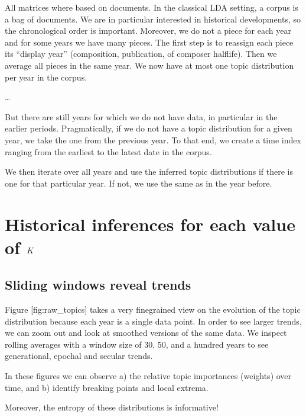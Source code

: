 \documentclass[letterpaper,10pt,english]{sphinxmanual}
\begin{document}
\sphinxAtStartPar
All matrices where based on documents. In the classical LDA setting, a
corpus is a bag of documents. We are in particular interested in
historical developments, so the chronological order is important.
Moreover, we do not a piece for each year and for some years we have
many pieces. The first step is to re\sphinxhyphen{}assign each piece its “display
year” (composition, publication, of composer half\sphinxhyphen{}life). Then we average
all pieces in the same year. We now have at most one topic distribution
per year in the corpus.

\sphinxAtStartPar
…

\sphinxAtStartPar
But there are still years for which we do not have data, in particular
in the earlier periods. Pragmatically, if we do not have a topic
distribution for a given year, we take the one from the previous year.
To that end, we create a time index ranging from the earliest to the
latest date in the corpus.

\sphinxAtStartPar
We then iterate over all years and use the inferred topic distributions
if there is one for that particular year. If not, we use the same as in
the year before.


\section{Historical inferences for each value of \protect\(K\protect\)}
\label{\detokenize{topic_modeling:historical-inferences-for-each-value-of-k}}

\subsection{Sliding windows reveal trends}
\label{\detokenize{topic_modeling:sliding-windows-reveal-trends}}
\sphinxAtStartPar
Figure {[}fig:raw\_topics{]} takes a very fine\sphinxhyphen{}grained view on the evolution
of the topic distribution because each year is a single data point. In
order to see larger trends, we can zoom out and look at smoothed
versions of the same data. We inspect rolling averages with a window
size of 30, 50, and a hundred years to see generational, epochal and
secular trends.

\sphinxAtStartPar
In these figures we can observe a) the relative topic importances
(weights) over time, and b) identify breaking points and local extrema.

\sphinxAtStartPar
Moreover, the entropy of these distributions is informative!
\end{document}
